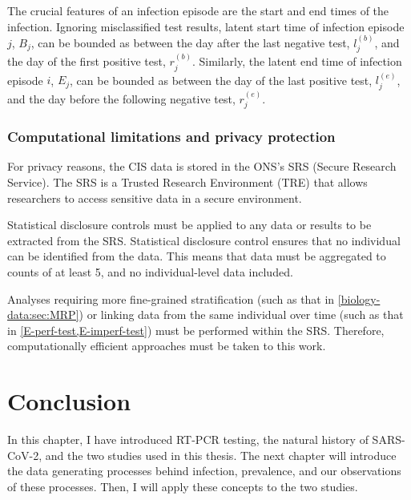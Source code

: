 \documentclass[thesis.tex]{subfiles}
\begin{document}
The crucial features of an infection episode are the start and end times of the infection.
Ignoring misclassified test results, latent start time of infection episode $j$, $B_j$, can be bounded as between the day after the last negative test, $l_j^{(b)}$, and the day of the first positive test, $r_j^{(b)}$.
Similarly, the latent end time of infection episode $i$, $E_j$, can be bounded as between the day of the last positive test, $l_j^{(e)}$, and the day before the following negative test, $r_j^{(e)}$.

\subsubsection{Computational limitations and privacy protection} \label{biology-data:sec:SRS}

For privacy reasons, the CIS data is stored in the ONS's SRS (Secure Research Service).
The SRS is a Trusted Research Environment (TRE) that allows researchers to access sensitive data in a secure environment.

Statistical disclosure controls must be applied to any data or results to be extracted from the SRS.
Statistical disclosure control ensures that no individual can be identified from the data.
This means that data must be aggregated to counts of at least 5, and no individual-level data included.

Analyses requiring more fine-grained stratification (such as that in \cref{biology-data:sec:MRP}) or linking data from the same individual over time (such as that in \cref{E-perf-test,E-imperf-test}) must be performed within the SRS.
Therefore, computationally efficient approaches must be taken to this work.

\section{Conclusion}

In this chapter, I have introduced RT-PCR testing, the natural history of SARS-CoV-2, and the two studies used in this thesis.
The next chapter will introduce the data generating processes behind infection, prevalence, and our observations of these processes.
Then, I will apply these concepts to the two studies.


\ifSubfilesClassLoaded{
  \listoftodos
}{}
\end{document}
